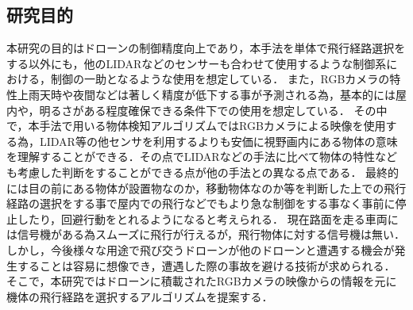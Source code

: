 \subsection{研究目的}
本研究の目的はドローンの制御精度向上であり，本手法を単体で飛行経路選択をする以外にも，他のLIDARなどのセンサーも合わせて使用するような制御系における，制御の一助となるような使用を想定している．
また，RGBカメラの特性上雨天時や夜間などは著しく精度が低下する事が予測される為，基本的には屋内や，明るさがある程度確保できる条件下での使用を想定している．
その中で，本手法で用いる物体検知アルゴリズムではRGBカメラによる映像を使用する為，LIDAR等の他センサを利用するよりも安価に視野画内にある物体の意味を理解することができる．その点でLIDARなどの手法に比べて物体の特性なども考慮した判断をすることができる点が他の手法との異なる点である．
最終的には目の前にある物体が設置物なのか，移動物体なのか等を判断した上での飛行経路の選択をする事で屋内での飛行などでもより急な制御をする事なく事前に停止したり，回避行動をとれるようになると考えられる．
現在路面を走る車両には信号機がある為スムーズに飛行が行えるが，飛行物体に対する信号機は無い．しかし，今後様々な用途で飛び交うドローンが他のドローンと遭遇する機会が発生することは容易に想像でき，遭遇した際の事故を避ける技術が求められる．
そこで，本研究ではドローンに積載されたRGBカメラの映像からの情報を元に機体の飛行経路を選択するアルゴリズムを提案する．
